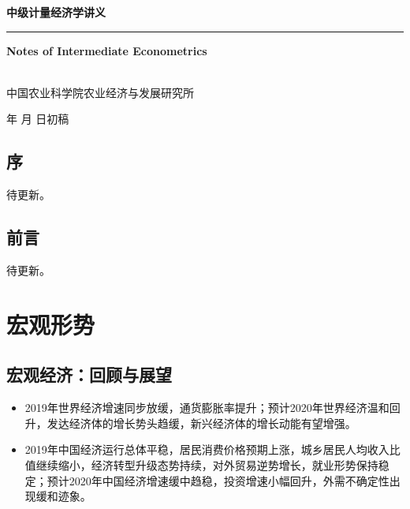 \documentclass{progbookcn}
\begin{document}
\begin{titlepage}
  \vspace*{25ex}

  \hspace{0.05\textwidth}\begin{minipage}{.9\textwidth}
    \flushright

    {\textbf{中级计量经济学讲义}}

    \rule{\linewidth}{.5pt}

    \vspace{2ex}

    {\textbf{Notes of Intermediate Econometrics}} \\

    \vspace{20ex}

    {} \\
    {中国农业科学院农业经济与发展研究所}
  \end{minipage}

  \vfill

  \centering
  {\number\year 年 \number\month 月 \number\day 日初稿}
\end{titlepage}
\thispagestyle{empty}


\frontmatter


\chapter{序}

待更新。

\chapter{前言}

待更新。

\clearpage
{
  \hypersetup{hidelinks}
  \tableofcontents
}


\mainmatter


\part{宏观形势}


\chapter{宏观经济：回顾与展望}
\begin{titledbox}{}
\begin{itemize}
  \item 2019年世界经济增速同步放缓，通货膨胀率提升；预计2020年世界经济温和回升，发达经济体的增长势头趋缓，新兴经济体的增长动能有望增强。
  \item 2019年中国经济运行总体平稳，居民消费价格预期上涨，城乡居民人均收入比值继续缩小，经济转型升级态势持续，对外贸易逆势增长，就业形势保持稳定；预计2020年中国经济增速缓中趋稳，投资增速小幅回升，外需不确定性出现缓和迹象。
 \end{itemize}
\end{titledbox}
\end{document}
